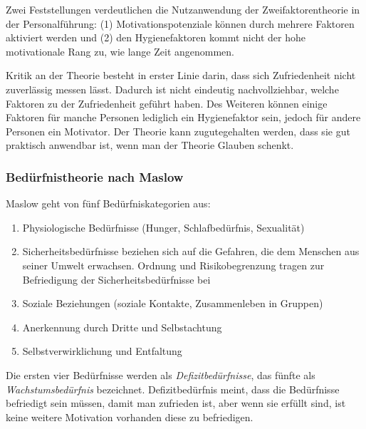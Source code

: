 Zwei Feststellungen verdeutlichen die Nutzanwendung der Zweifaktorentheorie in der Personalführung: (1) Motivationspotenziale können durch mehrere Faktoren aktiviert werden und (2) den Hygienefaktoren kommt nicht der hohe motivationale Rang zu, wie lange Zeit angenommen.

Kritik an der Theorie besteht in erster Linie darin, dass sich Zufriedenheit nicht zuverlässig messen lässt. Dadurch ist nicht eindeutig nachvollziehbar, welche Faktoren zu der Zufriedenheit geführt haben. Des Weiteren können einige Faktoren für manche Personen lediglich ein Hygienefaktor sein, jedoch für andere Personen ein Motivator. Der Theorie kann zugutegehalten werden, dass sie gut praktisch anwendbar ist, wenn man der Theorie Glauben schenkt.

\subsubsection{Bedürfnistheorie nach Maslow}

Maslow geht von fünf Bedürfniskategorien aus:
\begin{enumerate}
	\item Physiologische Bedürfnisse (Hunger, Schlafbedürfnis, Sexualität)
	\item Sicherheitsbedürfnisse beziehen sich auf die Gefahren, die dem Menschen aus seiner Umwelt erwachsen. Ordnung und Risikobegrenzung tragen zur Befriedigung der Sicherheitsbedürfnisse bei
	\item Soziale Beziehungen (soziale Kontakte, Zusammenleben in Gruppen)
	\item Anerkennung durch Dritte und Selbstachtung
	\item Selbstverwirklichung und Entfaltung
\end{enumerate}

Die ersten vier Bedürfnisse werden als {\it Defizitbedürfnisse}, das fünfte als {\it Wachstumsbedürfnis} bezeichnet. Defizitbedürfnis meint, dass die Bedürfnisse befriedigt sein müssen, damit man zufrieden ist, aber wenn sie erfüllt sind, ist keine weitere Motivation vorhanden diese zu befriedigen.

